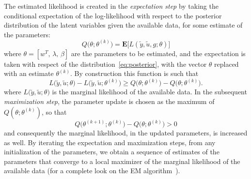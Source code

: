 \documentclass[10pt]{article}
\newcommand{\E}{\mathbf{E}}
\begin{document}
The estimated likelihood is created in the \emph{expectation step} by taking the conditional
expectation of the log-likelihood with respect to the posterior distribution of
the latent variables given the available data, for some estimate of the parameters:
\begin{equation}\label{eq:Q}
  Q\big(\theta;\theta^{(k)}\big) = \E\big[ L(\tilde y,\tilde u,g;\theta) \big]
\end{equation}
where $\theta = [w^T,\,\lambda,\,\beta]$ are the parameters to be estimated, and
the expectation is taken with respect of the distribution~\eqref{eq:posterior},
with the vector $\theta$ replaced with an estimate $\theta^{(k)}$. By
construction this function
is such that
\begin{equation}
  L\big(\tilde y,\tilde u;\theta\big) -
  L\big(\tilde y,\tilde u;\theta^{(k)}\big) \geq
  Q\big(\theta;\theta^{(k)}) - Q\big(\theta;\theta^{(k)}\big).
\end{equation}
where $L\big(\tilde y,\tilde u;\theta\big)$ is the marginal likelihood of the available data.
In the subsequent \emph{maximization step}, the parameter update is chosen as
the maximum of $Q(\theta;\theta^{(k)})$, so that
\begin{equation}
  Q\big(\theta^{(k+1)};\theta^{(k)}\big) - Q\big(\theta;\theta^{(k)}\big)> 0
\end{equation}
and consequently the marginal likelihood, in the updated parameters, is increased as well.
By iterating the expectation and maximization steps, from any initialization of
the parameters, we obtain a sequence of estimates of the parameters that
converge to a local maximizer of the marginal likelihood of the available data (for a
complete look on the EM algorithm~\cite{mclachlan2007algorithm}).
\end{document}
